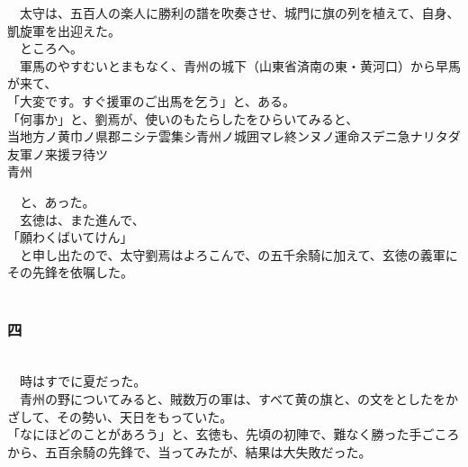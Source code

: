 \documentclass[
  paper=a5,
  fontsize=10pt,
  jafontsize=9.5pt,
  tate,                  %
  open_bracket_pos=nibu, %
]{jlreq}
\begin{document}
　太守は、五百人の楽人に勝利の譜を吹奏させ、城門に旗の列を植えて、自身、凱旋軍を出迎えた。\\


　ところへ。\\


　軍馬のやすむいとまもなく、青州の城下（山東省済南の東・黄河口）から早馬が来て、\\


「大変です。すぐ援軍のご出馬を乞う」と、ある。\\


「何事か」と、劉焉が、使いのもたらしたをひらいてみると、\\



当地方ノ黄巾ノ県郡ニシテ雲集シ青州ノ城囲マレ終ンヌノ運命スデニ急ナリタダ友軍ノ来援ヲ待ツ\\

青州


　と、あった。\\


　玄徳は、また進んで、\\


「願わくばいてけん」\\


　と申し出たので、太守劉焉はよろこんで、の五千余騎に加えて、玄徳の義軍にその先鋒を依嘱した。\\

\\

\subsubsection{四}

\\


　時はすでに夏だった。\\


　青州の野についてみると、賊数万の軍は、すべて黄の旗と、の文をとしたをかざして、その勢い、天日をもっていた。\\


「なにほどのことがあろう」と、玄徳も、先頃の初陣で、難なく勝った手ごころから、五百余騎の先鋒で、当ってみたが、結果は大失敗だった。\\
\end{document}
